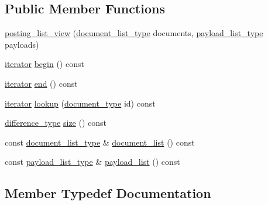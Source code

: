 \subsection*{Public Member Functions}
\begin{DoxyCompactItemize}
\item 
\mbox{\hyperlink{classirk_1_1posting__list__view_a2a67139a8790a38cffe1f20323c96bd2}{posting\+\_\+list\+\_\+view}} (\mbox{\hyperlink{classirk_1_1posting__list__view_ae024545dbbb464926a2024d956b7b7af}{document\+\_\+list\+\_\+type}} documents, \mbox{\hyperlink{classirk_1_1posting__list__view_aabf1afcb3a994971f30879354301e1fe}{payload\+\_\+list\+\_\+type}} payloads)
\item 
\mbox{\hyperlink{classirk_1_1posting__list__view_1_1iterator}{iterator}} \mbox{\hyperlink{classirk_1_1posting__list__view_a62065bb4544ebf8d6425b608a0852c11}{begin}} () const
\item 
\mbox{\hyperlink{classirk_1_1posting__list__view_1_1iterator}{iterator}} \mbox{\hyperlink{classirk_1_1posting__list__view_a57999e9c9b9347a86b242147fbd930b7}{end}} () const
\item 
\mbox{\hyperlink{classirk_1_1posting__list__view_1_1iterator}{iterator}} \mbox{\hyperlink{classirk_1_1posting__list__view_a2078e1a0c33d66cb0aa609fb8937911c}{lookup}} (\mbox{\hyperlink{classirk_1_1posting__list__view_ac4615e6e3d8ee1eb9a847b7a34919977}{document\+\_\+type}} id) const
\item 
\mbox{\hyperlink{classirk_1_1posting__list__view_af57ab26b3de14b52ca2150cd90288567}{difference\+\_\+type}} \mbox{\hyperlink{classirk_1_1posting__list__view_aad71ebe547caf256c8aab055c904ff19}{size}} () const
\item 
const \mbox{\hyperlink{classirk_1_1posting__list__view_ae024545dbbb464926a2024d956b7b7af}{document\+\_\+list\+\_\+type}} \& \mbox{\hyperlink{classirk_1_1posting__list__view_a786901ec3fe9ccf2ce0b9aafd90dd289}{document\+\_\+list}} () const
\item 
const \mbox{\hyperlink{classirk_1_1posting__list__view_aabf1afcb3a994971f30879354301e1fe}{payload\+\_\+list\+\_\+type}} \& \mbox{\hyperlink{classirk_1_1posting__list__view_ade6e30ce4668d92223f1cebcb28d6bea}{payload\+\_\+list}} () const
\end{DoxyCompactItemize}


\subsection{Member Typedef Documentation}
\mbox{\label{classirk_1_1posting__list__view_ae21b790c3e482f513bb41d4f8e7ae0c9}} 
